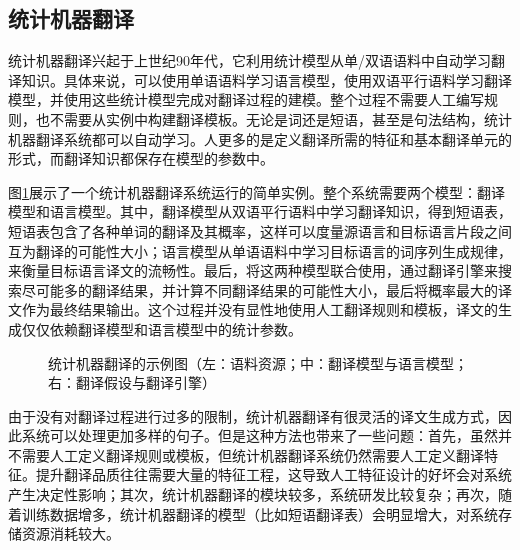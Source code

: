 
\subsection{统计机器翻译}

\parinterval 统计机器翻译兴起于上世纪90年代，它利用统计模型从单/双语语料中自动学习翻译知识。具体来说，可以使用单语语料学习语言模型，使用双语平行语料学习翻译模型，并使用这些统计模型完成对翻译过程的建模。整个过程不需要人工编写规则，也不需要从实例中构建翻译模板。无论是词还是短语，甚至是句法结构，统计机器翻译系统都可以自动学习。人更多的是定义翻译所需的特征和基本翻译单元的形式，而翻译知识都保存在模型的参数中。

\parinterval 图\ref{fig:1-14}展示了一个统计机器翻译系统运行的简单实例。整个系统需要两个模型：翻译模型和语言模型。其中，翻译模型从双语平行语料中学习翻译知识，得到短语表，短语表包含了各种单词的翻译及其概率，这样可以度量源语言和目标语言片段之间互为翻译的可能性大小；语言模型从单语语料中学习目标语言的词序列生成规律，来衡量目标语言译文的流畅性。最后，将这两种模型联合使用，通过翻译引擎来搜索尽可能多的翻译结果，并计算不同翻译结果的可能性大小，最后将概率最大的译文作为最终结果输出。这个过程并没有显性地使用人工翻译规则和模板，译文的生成仅仅依赖翻译模型和语言模型中的统计参数。

\begin{figure}[htp]
    \centering

    \caption{统计机器翻译的示例图（左：语料资源；中：翻译模型与语言模型；右：翻译假设与翻译引擎）}
    \label{fig:1-14}
\end{figure}

\parinterval 由于没有对翻译过程进行过多的限制，统计机器翻译有很灵活的译文生成方式，因此系统可以处理更加多样的句子。但是这种方法也带来了一些问题：首先，虽然并不需要人工定义翻译规则或模板，但统计机器翻译系统仍然需要人工定义翻译特征。提升翻译品质往往需要大量的特征工程，这导致人工特征设计的好坏会对系统产生决定性影响；其次，统计机器翻译的模块较多，系统研发比较复杂；再次，随着训练数据增多，统计机器翻译的模型（比如短语翻译表）会明显增大，对系统存储资源消耗较大。


